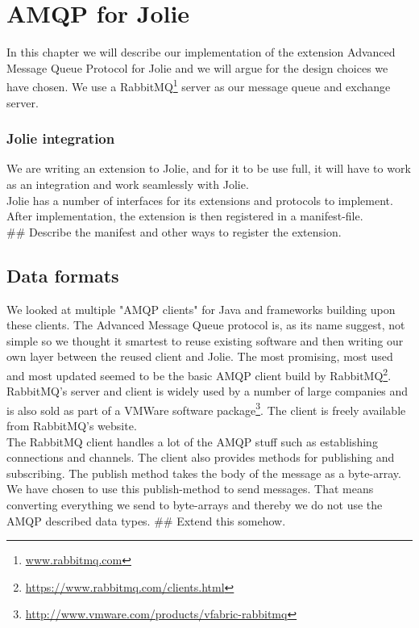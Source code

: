 \section{AMQP for Jolie}
In this chapter we will describe our implementation of the extension Advanced Message Queue Protocol for Jolie and we will argue for the design choices we have chosen. We use a RabbitMQ\footnote{\url{www.rabbitmq.com}} server as our message queue and exchange server.
\subsubsection{Jolie integration}
We are writing an extension to Jolie, and for it to be use full, it will have to work as an integration and work seamlessly with Jolie.\\
Jolie has a number of interfaces for its extensions and protocols to implement. After implementation, the extension is then registered in a manifest-file.\\
\#\# Describe the manifest and other ways to register the extension.
\subsection{Data formats}
We looked at multiple "AMQP clients" for Java and frameworks building upon these clients. The Advanced Message Queue protocol is, as its name suggest, not simple so we thought it smartest to reuse existing software and then writing our own layer between the reused client and Jolie. The most promising, most used and most updated seemed to be the basic AMQP client build by RabbitMQ\footnote{\url{https://www.rabbitmq.com/clients.html}}. RabbitMQ's server and client is widely used by a number of large companies and is also sold as part of a VMWare software package\footnote{\url{http://www.vmware.com/products/vfabric-rabbitmq}}. The client is freely available from RabbitMQ's website.\\
The RabbitMQ client handles a lot of the AMQP stuff such as establishing connections and channels. The client also provides methods for publishing and subscribing. The publish method takes the body of the message as a byte-array. We have chosen to use this publish-method to send messages. That means converting everything we send to byte-arrays and thereby we do not use the AMQP described data types. \#\# Extend this somehow.

